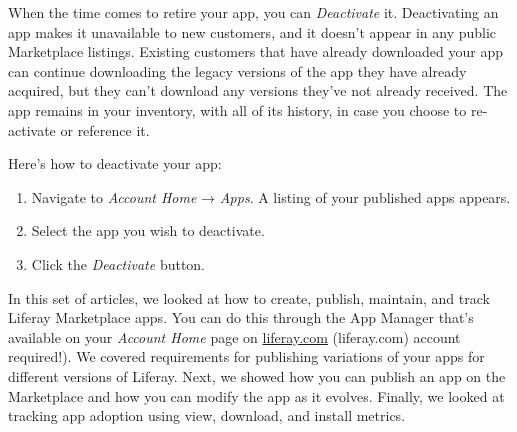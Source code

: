 When the time comes to retire your app, you can \emph{Deactivate} it.
Deactivating an app makes it unavailable to new customers, and it
doesn't appear in any public Marketplace listings. Existing customers
that have already downloaded your app can continue downloading the
legacy versions of the app they have already acquired, but they can't
download any versions they've not already received. The app remains in
your inventory, with all of its history, in case you choose to
re-activate or reference it.

Here's how to deactivate your app:

\begin{enumerate}
\def\labelenumi{\arabic{enumi}.}
\item
  Navigate to \emph{Account Home} → \emph{Apps}. A listing of your
  published apps appears.
\item
  Select the app you wish to deactivate.
\item
  Click the \emph{Deactivate} button.
\end{enumerate}

In this set of articles, we looked at how to create, publish, maintain,
and track Liferay Marketplace apps. You can do this through the App
Manager that's available on your \emph{Account Home} page on
\href{http://liferay.com}{liferay.com} (liferay.com) account required!).
We covered requirements for publishing variations of your apps for
different versions of Liferay. Next, we showed how you can publish an
app on the Marketplace and how you can modify the app as it evolves.
Finally, we looked at tracking app adoption using view, download, and
install metrics.
